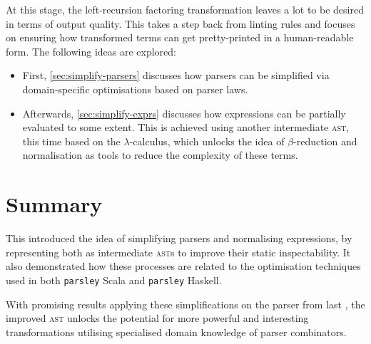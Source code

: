 \documentclass[../../main.tex]{subfiles}
\begin{document}
\label{sec:impl}
At this stage, the left-recursion factoring transformation leaves a lot to be desired in terms of output quality.
This  takes a step back from linting rules and focuses on ensuring how transformed terms can get pretty-printed in a human-readable form.
The following ideas are explored:
\begin{itemize}
  \item First, \cref{sec:simplify-parsers} discusses how parsers can be simplified via domain-specific optimisations based on parser laws.
  \item Afterwards, \cref{sec:simplify-exprs} discusses how expressions can be partially evaluated to some extent. This is achieved using another intermediate \textsc{ast}, this time based on the $\lambda$-calculus, which unlocks the idea of $\beta$-reduction and normalisation as tools to reduce the complexity of these terms.
\end{itemize}





\section*{Summary}
This  introduced the idea of simplifying parsers and normalising expressions, by representing both as intermediate \textsc{ast}s to improve their static inspectability.
It also demonstrated how these processes are related to the optimisation techniques used in both \texttt{parsley} Scala and \texttt{parsley} Haskell.

With promising results applying these simplifications on the  parser from last , the improved  \textsc{ast} unlocks the potential for more powerful and interesting transformations utilising specialised domain knowledge of parser combinators.
\end{document}
